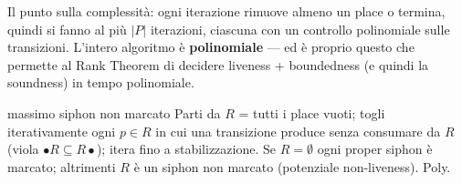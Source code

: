 Il punto sulla complessità: ogni iterazione rimuove almeno un place o termina, quindi si fanno al più $|P|$ iterazioni, ciascuna con un controllo polinomiale sulle transizioni. L'intero algoritmo è \textbf{polinomiale} — ed è proprio questo che permette al Rank Theorem di decidere liveness + boundedness (e quindi la soundness) in tempo polinomiale.

\begin{puntochiave}{massimo siphon non marcato}
Parti da $R$ = tutti i place vuoti; togli iterativamente ogni $p\in R$ in cui una transizione produce senza consumare da $R$ (viola $\bullet R\subseteq R\bullet$); itera fino a stabilizzazione. Se $R=\emptyset$ ogni proper siphon è marcato; altrimenti $R$ è un siphon non marcato (potenziale non-liveness). Poly.
\end{puntochiave}
